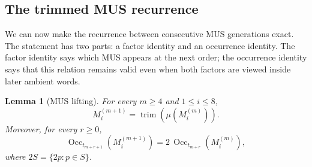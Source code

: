 \documentclass[11pt,a4paper]{article}
\newtheorem{lemma}[theorem]{Lemma}
\theoremstyle{definition}\newtheorem{definition}[theorem]{Definition}
\theoremstyle{remark}\newtheorem{remark}[theorem]{Remark}
\newcommand{\Occ}{\operatorname{Occ}}
\begin{document}
\subsection{The trimmed MUS recurrence}
\label{subsec:trimmed-lifting}

We can now make the recurrence between consecutive MUS generations exact. The statement has two parts: a factor identity and an occurrence identity. The factor identity says which MUS appears at the next order; the occurrence identity says that this relation remains valid even when both factors are viewed inside later ambient words.

\begin{lemma}[MUS lifting]
\label{lem:mus-lifting}
For every $m\ge4$ and $1\le i\le8$,
\begin{equation}
M_i^{(m+1)}=\operatorname{trim}\!\left(\mu(M_i^{(m)})\right).
\label{eq:mus-trim-recurrence}
\end{equation}
Moreover, for every $r\ge0$,
\begin{equation}
\Occ_{t_{m+r+1}}\!\left(M_i^{(m+1)}\right)
=2\,\Occ_{t_{m+r}}\!\left(M_i^{(m)}\right),
\label{eq:occ-doubling}
\end{equation}
where $2S=\{2p:p\in S\}$.
\end{lemma}
\end{document}
